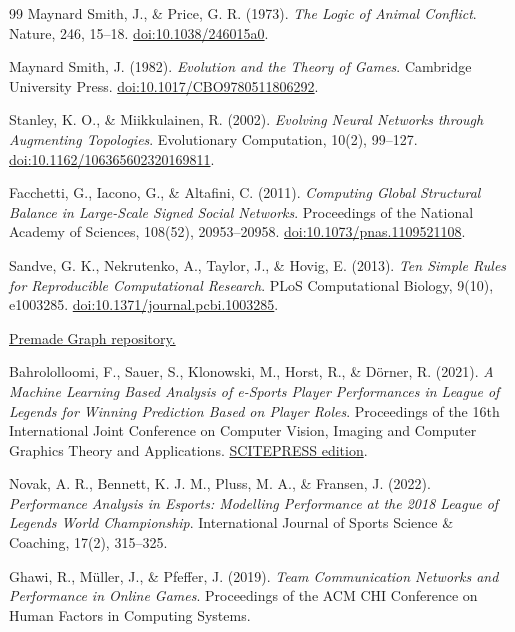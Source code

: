 ﻿\documentclass[a4paper,12pt]{report}
\begin{document}
\begin{thebibliography}{99}
Maynard Smith, J., \& Price, G. R. (1973). \textit{The Logic of Animal Conflict}. Nature, 246, 15--18. \href{https://doi.org/10.1038/246015a0}{doi:10.1038/246015a0}.

Maynard Smith, J. (1982). \textit{Evolution and the Theory of Games}. Cambridge University Press. \href{https://doi.org/10.1017/CBO9780511806292}{doi:10.1017/CBO9780511806292}.

Stanley, K. O., \& Miikkulainen, R. (2002). \textit{Evolving Neural Networks through Augmenting Topologies}. Evolutionary Computation, 10(2), 99--127. \href{https://doi.org/10.1162/106365602320169811}{doi:10.1162/106365602320169811}.


Facchetti, G., Iacono, G., \& Altafini, C. (2011). \textit{Computing Global Structural Balance in Large-Scale Signed Social Networks}. Proceedings of the National Academy of Sciences, 108(52), 20953--20958. \href{https://doi.org/10.1073/pnas.1109521108}{doi:10.1073/pnas.1109521108}.

Sandve, G. K., Nekrutenko, A., Taylor, J., \& Hovig, E. (2013). \textit{Ten Simple Rules for Reproducible Computational Research}. PLoS Computational Biology, 9(10), e1003285. \href{https://doi.org/10.1371/journal.pcbi.1003285}{doi:10.1371/journal.pcbi.1003285}.

\href{https://github.com/wpowertechgit/premadegraph}{Premade Graph repository.}


Bahrololloomi, F., Sauer, S., Klonowski, M., Horst, R., \& Dörner, R. (2021). \textit{A Machine Learning Based Analysis of e-Sports Player Performances in League of Legends for Winning Prediction Based on Player Roles}. Proceedings of the 16th International Joint Conference on Computer Vision, Imaging and Computer Graphics Theory and Applications. \href{https://www.scitepress.org/Papers/2022/108959/108959.pdf}{SCITEPRESS edition}.

Novak, A. R., Bennett, K. J. M., Pluss, M. A., \& Fransen, J. (2022). \textit{Performance Analysis in Esports: Modelling Performance at the 2018 League of Legends World Championship}. International Journal of Sports Science \& Coaching, 17(2), 315--325.

Ghawi, R., Müller, J., \& Pfeffer, J. (2019). \textit{Team Communication Networks and Performance in Online Games}. Proceedings of the ACM CHI Conference on Human Factors in Computing Systems.


\end{thebibliography}
\end{document}
